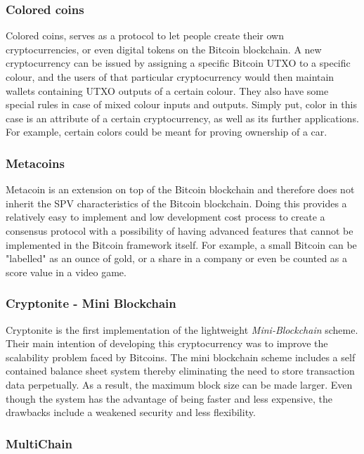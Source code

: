 \documentclass[english]{tktltiki}
\begin{document}
\subsubsection*{Colored coins}

Colored coins\cite{coloredcoin}, serves as a protocol to let people create their own cryptocurrencies, or even digital tokens on the Bitcoin blockchain. A new cryptocurrency can be issued by assigning a specific Bitcoin UTXO to a specific colour, and the users of that particular cryptocurrency would then maintain wallets containing UTXO outputs of a certain colour. They also have some special rules in case of mixed colour inputs and outputs. Simply put, color in this case is an attribute of a certain cryptocurrency, as well as its further applications. For example, certain colors could be meant for proving ownership of a car.

\subsubsection*{Metacoins}

Metacoin\cite{metacoin} is an extension on top of the Bitcoin blockchain and therefore does not inherit the SPV characteristics of the Bitcoin blockchain. Doing this provides a relatively easy to implement and low development cost process to create a consensus protocol with a possibility of having advanced features that cannot be implemented in the Bitcoin framework itself. For example, a small Bitcoin can be "labelled" as an ounce of gold, or a share in a company or even be counted as a score value in a video game.

\subsubsection*{Cryptonite - Mini Blockchain}

Cryptonite is the first implementation of the lightweight \textit{Mini-Blockchain} scheme\cite{cryptonite}. Their main intention of developing this cryptocurrency was to improve the scalability problem faced by Bitcoins. The mini blockchain scheme includes a self contained balance sheet system thereby eliminating the need to store transaction data perpetually. As a result, the maximum block size can be made larger. Even though the system has the advantage of being faster and less expensive, the drawbacks include a weakened security and less flexibility.

\subsubsection*{MultiChain}
\end{document}
